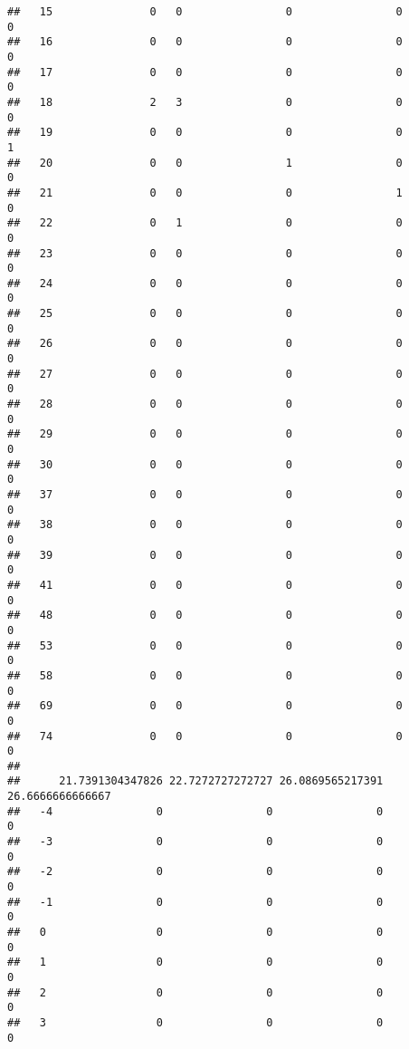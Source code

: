 \documentclass[]{article}
\begin{document}
\begin{verbatim}
##   15               0   0                0                0                0
##   16               0   0                0                0                0
##   17               0   0                0                0                0
##   18               2   3                0                0                0
##   19               0   0                0                0                1
##   20               0   0                1                0                0
##   21               0   0                0                1                0
##   22               0   1                0                0                0
##   23               0   0                0                0                0
##   24               0   0                0                0                0
##   25               0   0                0                0                0
##   26               0   0                0                0                0
##   27               0   0                0                0                0
##   28               0   0                0                0                0
##   29               0   0                0                0                0
##   30               0   0                0                0                0
##   37               0   0                0                0                0
##   38               0   0                0                0                0
##   39               0   0                0                0                0
##   41               0   0                0                0                0
##   48               0   0                0                0                0
##   53               0   0                0                0                0
##   58               0   0                0                0                0
##   69               0   0                0                0                0
##   74               0   0                0                0                0
##     
##      21.7391304347826 22.7272727272727 26.0869565217391 26.6666666666667
##   -4                0                0                0                0
##   -3                0                0                0                0
##   -2                0                0                0                0
##   -1                0                0                0                0
##   0                 0                0                0                0
##   1                 0                0                0                0
##   2                 0                0                0                0
##   3                 0                0                0                0

\end{verbatim}
\end{document}
